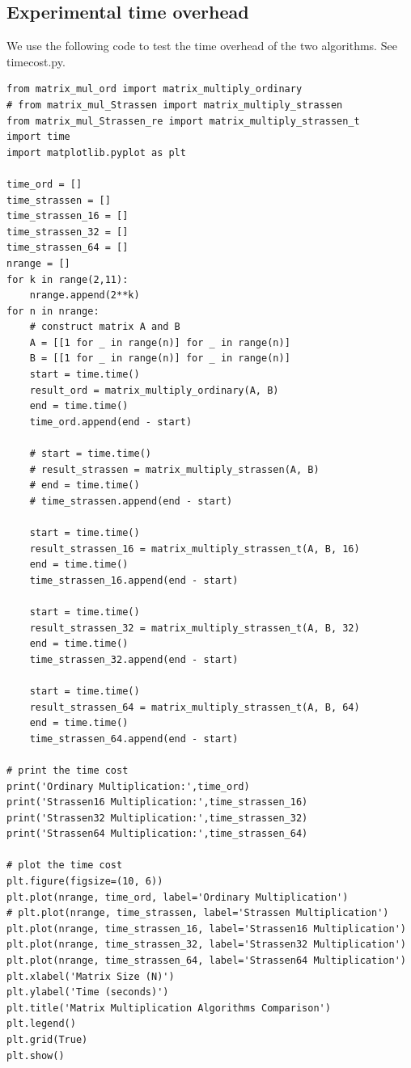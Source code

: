 \documentclass[UTF8]{ctexart}
\begin{document}
\subsection{Experimental time overhead}
We use the following code to test the time overhead of the two algorithms. See timecost.py.
\begin{lstlisting}
from matrix_mul_ord import matrix_multiply_ordinary
# from matrix_mul_Strassen import matrix_multiply_strassen
from matrix_mul_Strassen_re import matrix_multiply_strassen_t
import time
import matplotlib.pyplot as plt

time_ord = []
time_strassen = []
time_strassen_16 = []
time_strassen_32 = []
time_strassen_64 = []
nrange = []
for k in range(2,11):
    nrange.append(2**k)
for n in nrange:
    # construct matrix A and B
    A = [[1 for _ in range(n)] for _ in range(n)]
    B = [[1 for _ in range(n)] for _ in range(n)]
    start = time.time()
    result_ord = matrix_multiply_ordinary(A, B)
    end = time.time()
    time_ord.append(end - start)
    
    # start = time.time()
    # result_strassen = matrix_multiply_strassen(A, B)
    # end = time.time()
    # time_strassen.append(end - start)
    
    start = time.time()
    result_strassen_16 = matrix_multiply_strassen_t(A, B, 16)
    end = time.time()
    time_strassen_16.append(end - start)
    
    start = time.time()
    result_strassen_32 = matrix_multiply_strassen_t(A, B, 32)
    end = time.time()
    time_strassen_32.append(end - start)
    
    start = time.time()
    result_strassen_64 = matrix_multiply_strassen_t(A, B, 64)
    end = time.time()
    time_strassen_64.append(end - start)

# print the time cost
print('Ordinary Multiplication:',time_ord)
print('Strassen16 Multiplication:',time_strassen_16)
print('Strassen32 Multiplication:',time_strassen_32)
print('Strassen64 Multiplication:',time_strassen_64)

# plot the time cost
plt.figure(figsize=(10, 6))
plt.plot(nrange, time_ord, label='Ordinary Multiplication')
# plt.plot(nrange, time_strassen, label='Strassen Multiplication')
plt.plot(nrange, time_strassen_16, label='Strassen16 Multiplication')
plt.plot(nrange, time_strassen_32, label='Strassen32 Multiplication')
plt.plot(nrange, time_strassen_64, label='Strassen64 Multiplication')
plt.xlabel('Matrix Size (N)')
plt.ylabel('Time (seconds)')
plt.title('Matrix Multiplication Algorithms Comparison')
plt.legend()
plt.grid(True)
plt.show()   
\end{lstlisting}
\end{document}

